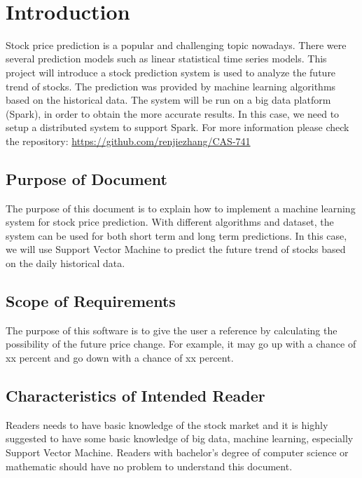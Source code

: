 \documentclass[12pt]{article}
\begin{document}
\newpage

\tableofcontents

~\newpage


\section{Introduction}

Stock price prediction is a popular and challenging topic nowadays. There were
several prediction models such as linear statistical time
series models. This project will introduce a stock prediction system is used to analyze the future trend of
stocks. The prediction was provided by machine learning algorithms based on the
historical data. The system will be run on a big data platform (Spark), in
order to obtain the more accurate results. In this case, we need to setup a
distributed system to support Spark.
For more information please check the repository: \url{https://github.com/renjiezhang/CAS-741}

\subsection{Purpose of Document}

The purpose of this document is to explain how to implement a machine learning
system for stock price prediction. With different algorithms and dataset, the
system can be used for both short term and long term predictions. In this case,
we will use Support Vector Machine to predict the future trend of stocks based
on the daily historical data.

\subsection{Scope of Requirements} 

The purpose of this software is to give the user a reference by calculating the
possibility of the future price change. For example, it may go up with a chance
of xx percent and go down with a chance of xx percent. 

\subsection{Characteristics of Intended Reader} 
Readers needs to have basic knowledge of the stock market and it is highly suggested to
have some basic knowledge of big data, machine learning,
especially Support Vector Machine. Readers with bachelor's degree of computer science or mathematic should have no problem to understand this document.
\end{document}
